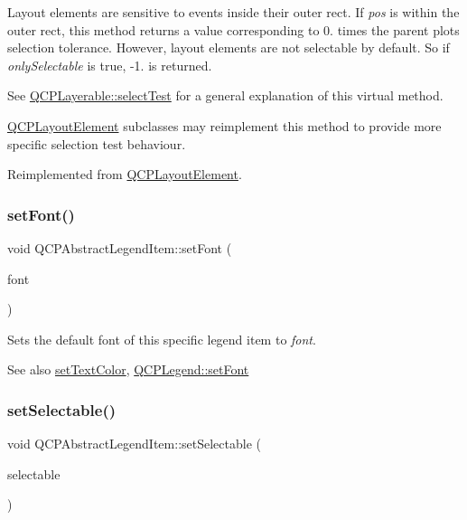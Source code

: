 Layout elements are sensitive to events inside their outer rect. If {\itshape pos} is within the outer rect, this method returns a value corresponding to 0. times the parent plot\textquotesingle{}s selection tolerance. However, layout elements are not selectable by default. So if {\itshape only\+Selectable} is true, -\/1. is returned.

See \mbox{\hyperlink{class_q_c_p_layerable_a04db8351fefd44cfdb77958e75c6288e}{Q\+C\+P\+Layerable\+::select\+Test}} for a general explanation of this virtual method.

\mbox{\hyperlink{class_q_c_p_layout_element}{Q\+C\+P\+Layout\+Element}} subclasses may reimplement this method to provide more specific selection test behaviour. 

Reimplemented from \mbox{\hyperlink{class_q_c_p_layout_element_ae97f483cccedadbf18ea4525ef240ee4}{Q\+C\+P\+Layout\+Element}}.

\mbox{\label{class_q_c_p_abstract_legend_item_a409c53455d8112f71d70c0c43eb10265}} 
\subsubsection{\texorpdfstring{setFont()}{setFont()}}
{\footnotesize\ttfamily void Q\+C\+P\+Abstract\+Legend\+Item\+::set\+Font (\begin{DoxyParamCaption}\item[{const Q\+Font \&}]{font }\end{DoxyParamCaption})}

Sets the default font of this specific legend item to {\itshape font}.

\begin{DoxySeeAlso}{See also}
\mbox{\hyperlink{class_q_c_p_abstract_legend_item_a6ebace6aaffaedcdab2d74e88acc2d1e}{set\+Text\+Color}}, \mbox{\hyperlink{class_q_c_p_legend_aa4cda8499e3cb0f3be415edc02984c73}{Q\+C\+P\+Legend\+::set\+Font}} 
\end{DoxySeeAlso}
\mbox{\label{class_q_c_p_abstract_legend_item_a9913ef48730551b696e7f98a2391c599}} 
\subsubsection{\texorpdfstring{setSelectable()}{setSelectable()}}
{\footnotesize\ttfamily void Q\+C\+P\+Abstract\+Legend\+Item\+::set\+Selectable (\begin{DoxyParamCaption}\item[{bool}]{selectable }\end{DoxyParamCaption})}

